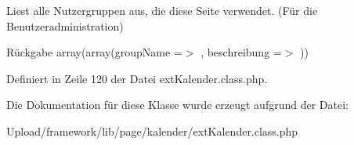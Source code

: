 Liest alle Nutzergruppen aus, die diese Seite verwendet. (Für die Benutzeradministration) \begin{DoxyReturn}{Rückgabe}
array(array(\textquotesingle{}group\+Name\textquotesingle{} =$>$ \textquotesingle{}\textquotesingle{}, \textquotesingle{}beschreibung\textquotesingle{} =$>$ \textquotesingle{}\textquotesingle{})) 
\end{DoxyReturn}


Definiert in Zeile 120 der Datei ext\+Kalender.\+class.\+php.



Die Dokumentation für diese Klasse wurde erzeugt aufgrund der Datei\+:\begin{DoxyCompactItemize}
\item 
Upload/framework/lib/page/kalender/ext\+Kalender.\+class.\+php\end{DoxyCompactItemize}
